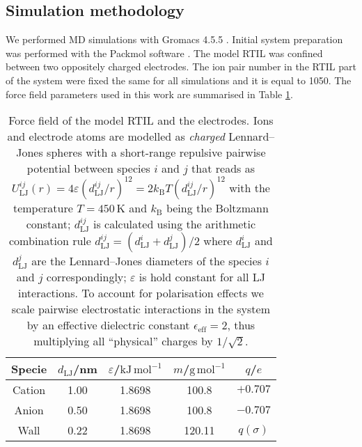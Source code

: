 \documentclass[final,5p,times,twocolumn]{elsarticle}
\begin{document}
\subsection{Simulation methodology}

We performed MD simulations with Gromacs 4.5.5 \cite{Hess2008}. Initial system preparation was performed with the Packmol software \cite{Martinez2009}. The model RTIL was confined between two oppositely charged electrodes. The ion pair number in the RTIL part of the system were fixed the same for all simulations and it is equal to 1050. The force field parameters used in this work are summarised in Table \ref{tab:forcefield}.

\begin{table}[htbp]
\caption[Force field of the model RTIL and the electrodes]{\label{tab:forcefield}Force field of the model RTIL and the electrodes. Ions and electrode atoms are modelled as \emph{charged} Lennard--Jones spheres with a short-range repulsive pairwise potential between species $i$ and $j$ that reads as $U_{\mathrm{LJ}}^{ij}(r)=4\varepsilon \left({ d_{\mathrm{LJ}}^{ij}}/{r}\right)^{12}=2k_{\mathrm{B}}T \left({d_{\mathrm{LJ}}^{ij}}/{r}\right)^{12}$ with the temperature $T=450\,\mathrm K$ and $k_{\mathrm{B}}$ being the Boltzmann constant; $d_{\mathrm{LJ}}^{ij}$  is calculated using the arithmetic combination rule  $d_{\mathrm{LJ}}^{ij}=({d_{\mathrm{LJ}}^{i}+d_{\mathrm{LJ}}^{j}})/{2}$ where $d_{\mathrm{LJ}}^{i}$ and  $d_{\mathrm{LJ}}^{j}$ are the Lennard--Jones diameters of the species $i$ and $j$ correspondingly; $\varepsilon$ is hold constant for all LJ interactions. To account for polarisation effects we scale pairwise electrostatic interactions in the system by an effective dielectric constant $\epsilon_{\mathrm{eff}}=2$, thus multiplying all ``physical'' charges by $1/\sqrt2$.
}
\centering
{\footnotesize
\begin{tabular}{ccccc} \hline
Specie & $d_{\mathrm{LJ}}$/nm & $\varepsilon$/$\mathrm{kJ\,mol}^{-1}$ & $m$/$\mathrm{g\,mol}^{-1}$ & $q$/$e$\\ \hline \hline%
Cation & 1.00 & 1.8698 & 100.8 & $+0.707$  \\
Anion & 0.50 & 1.8698 & 100.8  & $-0.707$  \\
Wall & 0.22 & 1.8698 & 120.11 &  $q(\sigma)$ \\\hline
\end{tabular}
}
\end{table}
\end{document}
